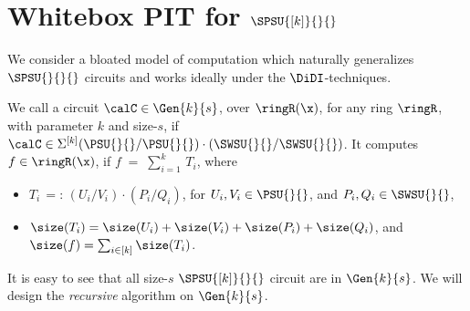\section{Whitebox PIT for \texorpdfstring{$\SPSU{[k]}{}{}$}{SkPSU}} \label{sec:pf:thm1}

We consider a bloated model of computation which naturally generalizes $\SPSU{}{}{}$ circuits and works ideally under the $\DiDI$-techniques.

\begin{definition}
We call a circuit $\calC \in \Gen{k}{s}$, over $\ringR(\x)$, for any ring $\ringR$, with parameter $k$ and size-$s$, if $\calC \in \Sigma^{[k]} (\PSU{}{}/\PSU{}{}) \cdot (\SWSU{}{}/\SWSU{}{})$. It computes $f \in \ringR(\x)$, if $f\;=\; \sum_{i=1}^k\, T_{i}$, where 
    \begin{itemize}
        \item $T_i\,=:\,(U_i/V_i)\cdot (P_i/Q_i)$, for $U_i, V_i \in \PSU{}{}$, and $P_i,Q_i \in \SWSU{}{}$,  
%
        \item $\size(T_i) = \size(U_i) + \size(V_i) + \size(P_i) + \size(Q_i)$, and $\size(f)=\sum_{i \in [k]} \size(T_i)$.
    \end{itemize}
\end{definition}

\noindent It is easy to see that all size-$s$ $\SPSU{[k]}{}{}$ circuit are in $\Gen{k}{s}$. We will design the \emph{recursive} algorithm on $\Gen{k}{s}$. 

